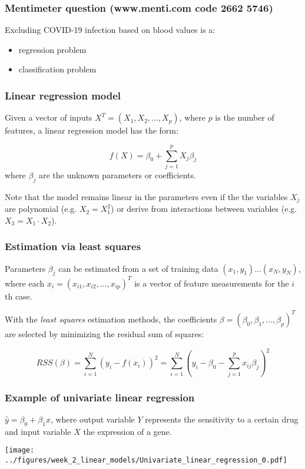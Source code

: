 \documentclass[notes]{beamer}          %
\begin{document}
\begin{frame}
\frametitle{Mentimeter question (www.menti.com code 2662 5746)}

Excluding COVID-19 infection based on blood values is a:
\begin{itemize}
    \item regression problem
    \item classification problem
\end{itemize}
\end{frame}

\begin{frame}
\frametitle{Linear regression model}
Given a vector of inputs $X^T = (X_1, X_2, \dots, X_p)$, where $p$ is the number of features, a linear regression model has the form:

\begin{equation*}
f(X)=\beta_0 + \sum_{j=1}^p X_j\beta_j
\end{equation*}
where $\beta_j$ are the unknown parameters or coefficients. 

\vspace{5mm} 

Note that the model remains linear in the parameters even if the the variables $X_j$ are polynomial (e.g. $X_2 = X_1^2$) or derive from interactions between variables (e.g. $X_3 = X_1 \cdot X_2$).

\end{frame}

\begin{frame}
\frametitle{Estimation via least squares}
Parameters $\beta_j$ can be estimated from a set of training data $(x_1,y_1) \dots (x_N,y_N)$, where each $x_i=(x_{i1}, x_{i2}, \dots, x_{ip})^T$ is a vector of feature measurements for the $i$th case.

\vspace{5mm} 

With the \textit{least squares} estimation methods, the coefficients $\beta=(\beta_0, \beta_1, \dots, \beta_p)^T$ are selected by minimizing the residual sum of squares:

\begin{equation*}
RSS(\beta) = \sum_{i=1}^N (y_i - f(x_i))^2 = \sum_{i=1}^N (y_i - \beta_0 -  \sum_{j=1}^p x_{ij}\beta_j)^2
\end{equation*}
\end{frame}

\begin{frame}
\frametitle{Example of univariate linear regression}
$\hat{y} = \beta_0 + \beta_1 x$, where output variable $Y$ represents the sensitivity to a certain drug and input variable $X$ the expression of a gene.

\begin{center}
\texttt{[image: ../figures/week\_2\_linear\_models/Univariate\_linear\_regression\_0.pdf]}
\end{center}

\end{frame}
\end{document}
